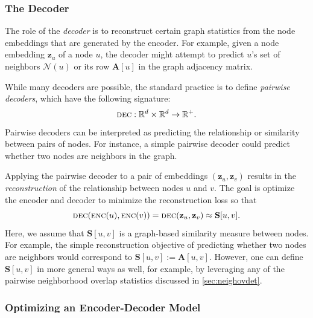 \documentclass[10pt]{book}
\let\defaultmarginpar\marginpar
\renewcommand\marginpar[2][]{\defaultmarginpar{\itshape\color{gray}#2}}
\begin{document}
\subsubsection{The Decoder}

The role of the \emph{decoder}\marginpar{decoder} is to reconstruct certain graph statistics from the node embeddings that are generated by the encoder. For example, given a node embedding $\mathbf z_u$ of a node $u$, the decoder might attempt to predict $u$'s set of neighbors $\mathcal N(u)$ or its row $\mathbf A[u]$ in the graph adjacency matrix.

While many decoders are possible, the standard practice is to define \emph{pairwise decoders}\marginpar{pairwise decoders}, which have the following signature:
\begin{equation}
    \textsc{dec}: \mathbb R^d \times \mathbb R^d \rightarrow \mathbb R^+.
\end{equation}
Pairwise decoders can be interpreted as predicting the relationship or similarity between pairs of nodes. For instance, a simple pairwise decoder could predict whether two nodes are neighbors in the graph.

Applying the pairwise decoder to a pair of embeddings $(\mathbf z_u, \mathbf z_v)$ results in the \emph{reconstruction} of the relationship between nodes $u$ and $v$. The goal is optimize the encoder and decoder to minimize the reconstruction loss so that
\begin{equation}
    \textsc{dec}(\textsc{enc}(u), \textsc{enc}(v)) = \textsc{dec}(\mathbf z_u, \mathbf z_v) \approx \mathbf S[u, v].
    \label{eq:reconstrloss}
\end{equation}
Here, we assume that $\mathbf S[u, v]$ is a graph-based similarity measure between nodes. For example, the simple reconstruction objective of predicting whether two nodes are neighbors would correspond to $\mathbf S[u, v] := \mathbf A[u, v]$. However, one can define $\mathbf S[u, v]$ in more general ways as well, for example, by leveraging any of the pairwise neighborhood overlap statistics discussed in \autoref{sec:neighovdet}.


\subsubsection{Optimizing an Encoder-Decoder Model}
\end{document}
